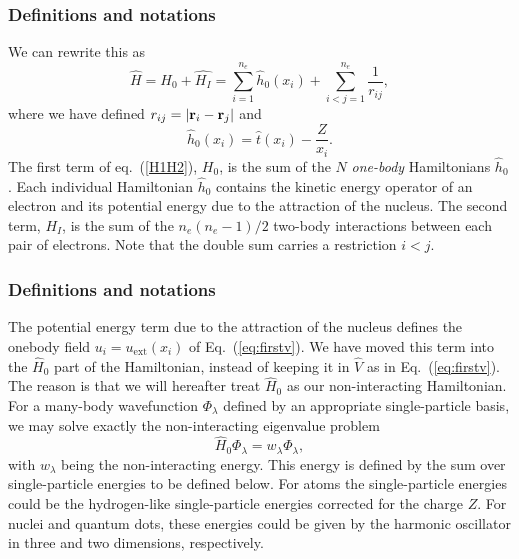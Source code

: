 \documentclass[compress]{beamer}
\begin{document}
\frame
{
  \frametitle{Definitions and notations}
\begin{small}
{\scriptsize
 We can rewrite this as
\begin{equation}
    \hat{H} = \hat{H_0} + \hat{H_I} 
    = \sum_{i=1}^{n_e}\hat{h}_0(x_i) + \sum_{i<j=1}^{n_e}\frac{1}{r_{ij}},
\label{H1H2}
\end{equation}
where  we have defined $r_{ij}=| {\bf r}_i-{\bf r}_j|$ and
\begin{equation}
  \hat{h}_0(x_i) =  \hat{t}(x_i) - \frac{Z}{x_i}.
\label{hi}
\end{equation}
The first term of eq.~(\ref{H1H2}), $H_0$, is the sum of the $N$
\emph{one-body} Hamiltonians $\hat{h}_0$. Each individual
Hamiltonian $\hat{h}_0$ contains the kinetic energy operator of an
electron and its potential energy due to the attraction of the
nucleus. The second term, $H_I$, is the sum of the $n_e(n_e-1)/2$
two-body interactions between each pair of electrons. Note that the double sum carries a restriction $i<j$.
}
\end{small}
}

\frame
{
  \frametitle{Definitions and notations}
\begin{small}
{\scriptsize
The potential energy term due to the attraction of the nucleus defines the onebody field $u_i=u_{\mathrm{ext}}(x_i)$ of Eq.~(\ref{eq:firstv}).
We have moved this term into the $\hat{H}_0$ part of the Hamiltonian, instead of keeping  it in $\hat{V}$ as in  Eq.~(\ref{eq:firstv}).
The reason is that we will hereafter treat $\hat{H}_0$ as our non-interacting  Hamiltonian. For a many-body wavefunction $\Phi_{\lambda}$ defined by an  
appropriate single-particle basis, we may solve exactly the non-interacting eigenvalue problem 
\[
\hat{H}_0\Phi_{\lambda}= w_{\lambda}\Phi_{\lambda},
\]
with $w_{\lambda}$ being the non-interacting energy. This energy is defined by the sum over single-particle energies to be defined below.
For atoms the single-particle energies could be the hydrogen-like single-particle energies corrected for the charge $Z$. For nuclei and quantum
dots, these energies could be given by the harmonic oscillator in three and two dimensions, respectively.
}
\end{small}
}
\end{document}
